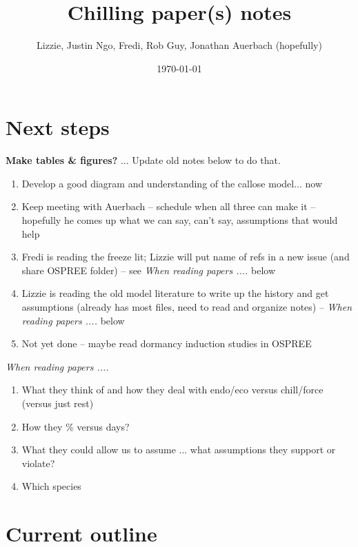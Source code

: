 \documentclass[11pt,letter]{article}
\begin{document}

\renewcommand{\refname}{\CHead{}}

\title{Chilling paper(s) notes}
\author{Lizzie, Justin Ngo, Fredi, Rob Guy, Jonathan Auerbach (hopefully)} %
\date{\today}
\maketitle
\tableofcontents

\section{Next steps}

{\bf Make tables \& figures?} ... Update old notes below to do that. 

\begin{enumerate}
\item Develop a good diagram and understanding of the callose model... now
\item Keep meeting with Auerbach -- schedule when all three can make it -- hopefully he comes up what we can say, can't say, assumptions that would help
\item Fredi is reading the freeze lit; Lizzie will put name of refs in a new issue (and share OSPREE folder) -- see \emph{When reading papers .... } below
\item Lizzie is reading the old model literature to write up the history and get assumptions (already has most files, need to read and organize notes) -- \emph{When reading papers .... } below
\item Not yet done -- maybe read dormancy induction studies in OSPREE 
\end{enumerate}

\emph{When reading papers .... }
\begin{enumerate}
\item What they think of and how they deal with endo/eco versus chill/force (versus just rest)
\item How they \% versus days?
\item What they could allow us to assume ... what assumptions they support or violate?
\item Which species
\end{enumerate}


\section{Current outline} %
\end{document}

